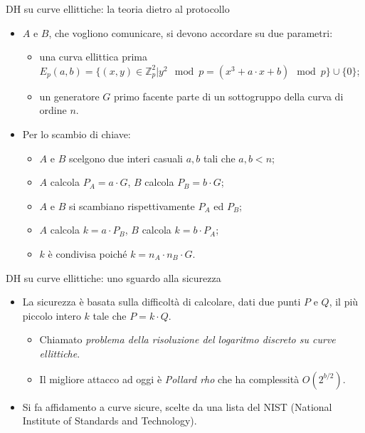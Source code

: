 \documentclass[11pt,svgnames,smaller,aspectratio=169,italian]{beamer}
\begin{document}
\begin{frame}{DH su curve ellittiche: la teoria dietro al protocollo}
	\begin{itemize}
		\item $A$ e $B$, che vogliono comunicare, si devono accordare su due parametri:
			\begin{itemize}
				\item una curva ellittica prima $E_{p}(a, b) = \{(x, y) \in \mathds{Z}_{p}^{2} | y^{2} \mod p = (x^{3} + a \cdot x + b) \mod p \} \cup \{0\}$;
				\item un generatore $G$ primo facente parte di un sottogruppo della curva di ordine $n$.
			\end{itemize}
		\item Per lo scambio di chiave:
			\begin{itemize}
				\item $A$ e $B$ scelgono due interi casuali $a, b$ tali che $a, b < n$;
				\item $A$ calcola $P_{A} = a \cdot G$, $B$ calcola $P_{B} = b \cdot G$;
				\item $A$ e $B$ si scambiano rispettivamente $P_{A}$ ed $P_{B}$;
				\item $A$ calcola $k = a \cdot P_{B}$, $B$ calcola $k = b \cdot P_{A}$;
				\item $k$ è condivisa poiché $k = n_{A} \cdot n_{B} \cdot G$.
			\end{itemize}
	\end{itemize}
\end{frame}

\begin{frame}{DH su curve ellittiche: uno sguardo alla sicurezza}
	\begin{itemize}
		\item La sicurezza è basata sulla difficoltà di calcolare, dati due punti $P$ e $Q$, il più piccolo intero $k$ tale che $P = k \cdot Q$.
			\begin{itemize}
				\item Chiamato \emph{problema della risoluzione del logaritmo discreto su curve ellittiche}.
				\item Il migliore attacco ad oggi è \emph{Pollard rho} che ha complessità $O(2^{b/2})$.
			\end{itemize}
		\item Si fa affidamento a curve sicure, scelte da una lista del NIST (National Institute of Standards and Technology).
	\end{itemize}
\end{frame}
\end{document}
